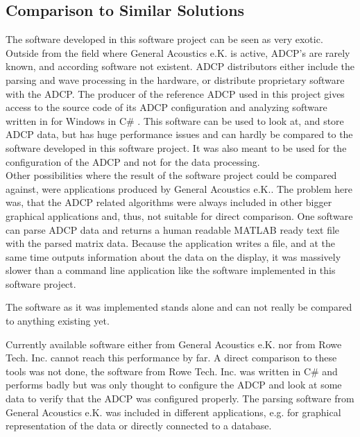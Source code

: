 \subsection{Comparison to Similar Solutions}
The software developed in this software project can be seen as very exotic. Outside from the field where General Acoustics e.K. is active, ADCP's are rarely known, and according software not existent. ADCP distributors either include the parsing and wave processing in the hardware, or distribute proprietary software with the ADCP. The producer of the reference ADCP used in this project gives access to the source code of its ADCP configuration and analyzing software written in for Windows in C\# \cite{rowe_git}. This software can be used to look at, and store ADCP data, but has huge performance issues and can hardly be compared to the software developed in this software project. It was also meant to be used for the configuration of the ADCP and not for the data processing.\\
Other possibilities where the result of the software project could be compared against, were applications produced by General Acoustics e.K.. The problem here was, that the ADCP related algorithms were always included in other bigger graphical applications and, thus, not suitable for direct comparison. One software can parse ADCP data and returns a human readable MATLAB ready text file with the parsed matrix data. Because the application writes a file, and at the same time outputs information about the data on the display, it was massively slower than a command line application like the software implemented in this software project.

The software as it was implemented stands alone and can not really be compared to anything existing yet. 

Currently available software either from General Acoustics e.K. nor from Rowe Tech. Inc. cannot reach this performance by far. A direct comparison to these tools was not done, the software from Rowe Tech. Inc. was written in C\# and performs badly but was only thought to configure the ADCP and look at some data to verify that the ADCP was configured properly. The parsing software from General Acoustics e.K. was included in different applications, e.g. for graphical representation of the data or directly connected to a database.   



